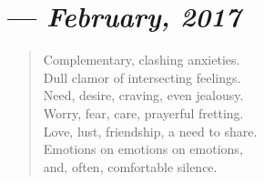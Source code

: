 \section{--- \textit{February, 2017}}

\begin{verse}
Complementary, clashing anxieties.\\
Dull clamor of intersecting feelings.\\
Need, desire, craving, even jealousy.\\
Worry, fear, care, prayerful fretting.\\
Love, lust, friendship, a need to share.\\
Emotions on emotions on emotions,\\
and, often, comfortable silence.
\end{verse}
